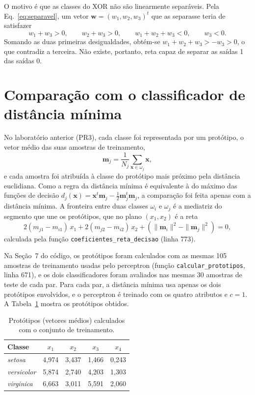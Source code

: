 \documentclass[12pt,a4paper]{article}
\begin{document}
O motivo é que as classes do XOR não são linearmente separáveis. Pela Eq.~\eqref{eq:separavel}, um vetor $\mathbf{w} = (w_1, w_2, w_3)^t$ que as separasse teria de satisfazer
\[
  w_1 + w_3 > 0, \qquad w_2 + w_3 > 0, \qquad w_1 + w_2 + w_3 < 0, \qquad w_3 < 0.
\]
Somando as duas primeiras desigualdades, obtém-se $w_1 + w_2 + w_3 > -w_3 > 0$, o que contradiz a terceira. Não existe, portanto, reta capaz de separar as saídas 1 das saídas 0.

\section{Comparação com o classificador de distância mínima}\label{sec:comparacao}

No laboratório anterior (PR3), cada classe foi representada por um protótipo, o vetor médio das suas amostras de treinamento,
\begin{equation}
  \mathbf{m}_j = \frac{1}{N_j}\sum_{\mathbf{x} \in \omega_j} \mathbf{x},
  \label{eq:prototipo}
\end{equation}
e cada amostra foi atribuída à classe do protótipo mais próximo pela distância euclidiana. Como a regra da distância mínima é equivalente à do máximo das funções de decisão $d_j(\mathbf{x}) = \mathbf{x}^t\mathbf{m}_j - \frac{1}{2}\mathbf{m}_j^t\mathbf{m}_j$, a comparação foi feita apenas com a distância mínima. A fronteira entre duas classes $\omega_i$ e $\omega_j$ é a mediatriz do segmento que une os protótipos, que no plano $(x_1, x_2)$ é a reta
\begin{equation}
  2(m_{j1} - m_{i1})\,x_1 + 2(m_{j2} - m_{i2})\,x_2 + \left(\|\mathbf{m}_i\|^2 - \|\mathbf{m}_j\|^2\right) = 0,
  \label{eq:mediatriz}
\end{equation}
calculada pela função \texttt{coeficientes\_reta\_decisao} (linha 773).

Na Seção~7 do código, os protótipos foram calculados com as mesmas 105 amostras de treinamento usadas pelo perceptron (função \texttt{calcular\_prototipos}, linha 671), e os dois classificadores foram avaliados nas mesmas 30 amostras de teste de cada par. Para cada par, a distância mínima usa apenas os dois protótipos envolvidos, e o perceptron é treinado com os quatro atributos e $c = 1$. A Tabela~\ref{tab:prototipos} mostra os protótipos obtidos.

\begin{table}[H]
\centering
\caption{Protótipos (vetores médios) calculados com o conjunto de treinamento.}
\label{tab:prototipos}
\begin{tabular}{lcccc}
\toprule
Classe & $x_1$ & $x_2$ & $x_3$ & $x_4$ \\
\midrule
\emph{setosa}     & 4,974 & 3,437 & 1,466 & 0,243 \\
\emph{versicolor} & 5,874 & 2,740 & 4,203 & 1,303 \\
\emph{virginica}  & 6,663 & 3,011 & 5,591 & 2,060 \\
\bottomrule
\end{tabular}
\end{table}
\end{document}
